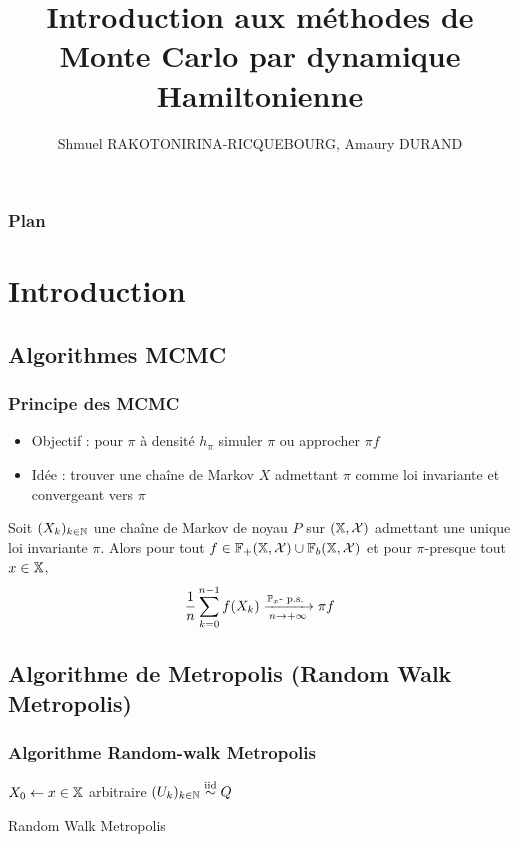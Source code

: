 \documentclass[10pt]{beamer}
\title[HMC]{Introduction aux méthodes de Monte Carlo par dynamique Hamiltonienne}
\author{Shmuel RAKOTONIRINA-RICQUEBOURG, Amaury DURAND}
\begin{document}
\begin{frame}
\titlepage
\end{frame}
\begin{frame}
  \frametitle{Plan}
  \tableofcontents[hideallsubsections]
\end{frame}

\section{Introduction}

\subsection{Algorithmes MCMC}

\begin{frame}
	\frametitle{Principe des MCMC}
	\begin{itemize}
		\item Objectif : pour $\pi$ à densité $h_\pi$ simuler $\pi$ ou approcher $\pi f$
		\item Idée : trouver une chaîne de Markov $X$ admettant $\pi$ comme loi invariante et convergeant vers $\pi$
	\end{itemize}
	\begin{Thm}\label{thm:ergodic}
		Soit $(X_k)_{k \in \mathbb{N}}$ une chaîne de Markov de noyau $P$ sur $(\mathbb{X}, \mathcal{X})$ admettant une unique loi invariante $\pi$. Alors pour tout $f \in \mathbb{F}_+(\mathbb{X}, \mathcal{X}) \cup \mathbb{F}_b(\mathbb{X}, \mathcal{X})$ et pour $\pi$-presque tout $x \in \mathbb{X}$,
		$$\frac{1}{n} \sum_{k=0}^{n-1} f(X_k) \xrightarrow[n \to +\infty]{\PP_x\text{-}\ps} \pi f$$
	\end{Thm}
\end{frame}

\subsection{Algorithme de Metropolis (Random Walk Metropolis)}

\begin{frame}
  \frametitle{Algorithme Random-walk Metropolis}
  \begin{center}
    {\small 
		\begin{algorithm}[H]
			$X_0 \leftarrow x \in \mathbb{X}$ arbitraire\;
			$(U_k)_{k \in \mathbb{N}} \stackrel{\rm iid}{\sim} Q$ \;
			\caption{Random Walk Metropolis}
			\label{algo:metropolis}
                      \end{algorithm}
                      }
	\end{center}
\end{frame}
\end{document}
